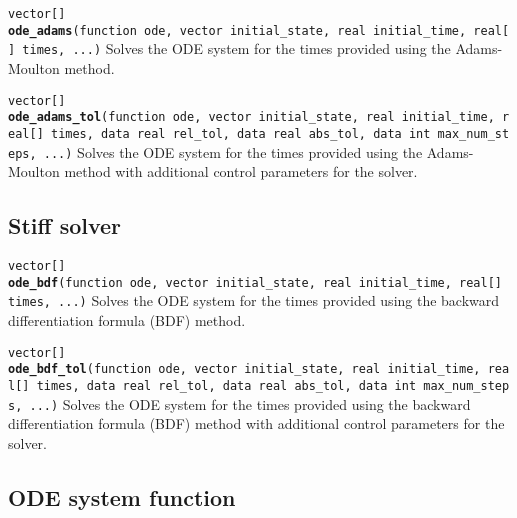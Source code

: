 \documentclass[
  10pt,
]{book}
\begin{document}
\texttt{vector{[}{]}} \textbf{\texttt{ode\_adams}}\texttt{(function\ ode,\ vector\ initial\_state,\ real\ initial\_time,\ real{[}{]}\ times,\ ...)}\newline
Solves the ODE system for the times provided using the Adams-Moulton method.


\texttt{vector{[}{]}} \textbf{\texttt{ode\_adams\_tol}}\texttt{(function\ ode,\ vector\ initial\_state,\ real\ initial\_time,\ real{[}{]}\ times,\ data\ real\ rel\_tol,\ data\ real\ abs\_tol,\ data\ int\ max\_num\_steps,\ ...)}\newline
Solves the ODE system for the times provided using the Adams-Moulton
method with additional control parameters for the solver.

\hypertarget{stiff-solver}{%
\subsection{Stiff solver}\label{stiff-solver}}


\texttt{vector{[}{]}} \textbf{\texttt{ode\_bdf}}\texttt{(function\ ode,\ vector\ initial\_state,\ real\ initial\_time,\ real{[}{]}\ times,\ ...)}\newline
Solves the ODE system for the times provided using the backward differentiation
formula (BDF) method.


\texttt{vector{[}{]}} \textbf{\texttt{ode\_bdf\_tol}}\texttt{(function\ ode,\ vector\ initial\_state,\ real\ initial\_time,\ real{[}{]}\ times,\ data\ real\ rel\_tol,\ data\ real\ abs\_tol,\ data\ int\ max\_num\_steps,\ ...)}\newline
Solves the ODE system for the times provided using the backward differentiation
formula (BDF) method with additional control parameters for the solver.

\hypertarget{ode-system-function}{%
\subsection{ODE system function}\label{ode-system-function}}
\end{document}
